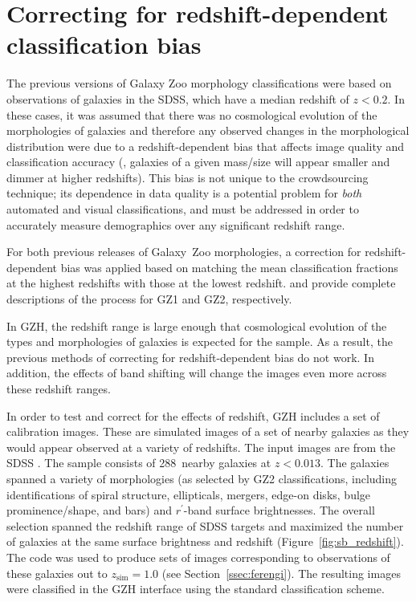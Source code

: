 \documentclass[twocolumn]{aastex6}
\begin{document}
\section{Correcting for redshift-dependent classification bias}\label{sec:debiasing}

The previous versions of Galaxy Zoo morphology classifications
\citep{lin11,wil13} were based on observations of galaxies in the SDSS,
which have a median redshift of $z<0.2$. In these cases, it
was assumed that there was no cosmological evolution of the morphologies of
galaxies and therefore any observed changes in the morphological distribution
were due to a redshift-dependent bias that affects image quality and
classification accuracy (\ie, galaxies of a given mass/size will appear smaller
and dimmer at higher redshifts).  This bias is not unique to the crowdsourcing
technique; its dependence in data quality is a potential problem for
\emph{both} automated and visual classifications, and must be addressed in
order to accurately measure demographics over any significant redshift range. 

For both previous releases of Galaxy~Zoo morphologies, a correction for
redshift-dependent bias was applied based on matching the mean classification
fractions at the highest redshifts with those at the lowest redshift.
\citet{bam09} and \citet{wil13} provide complete descriptions of the process
for GZ1 and GZ2, respectively.

In GZH, the redshift range is large enough that cosmological
evolution of the types and morphologies of galaxies is expected for the \hst{}
sample. As a result, the previous methods of correcting for
redshift-dependent bias do not work. In addition, the effects of band shifting
will change the images even more across these redshift ranges. 

In order to test and correct for the effects of redshift, GZH includes a set of
calibration images.  These are simulated images of a set of nearby galaxies as
they would appear observed at a variety of redshifts.  The input images are
from the SDSS \citep{yor00,str02}.  The sample consists of 288~nearby galaxies
at $z<0.013$. The galaxies spanned a variety of morphologies (as selected by
GZ2 classifications, including identifications of spiral structure,
ellipticals, mergers, edge-on disks, bulge prominence/shape, and bars) and
$r^\prime$-band surface brightnesses.  The overall selection spanned the
redshift range of SDSS targets and maximized the number of \hst{} galaxies at
the same surface brightness and redshift (Figure~\ref{fig:sb_redshift}).  The
\ferengi{} code was used to produce sets of images corresponding to
observations of these galaxies out to $z_\mathrm{sim}=1.0$ (see
Section~\ref{ssec:ferengi}).  The resulting images were classified in the GZH
interface using the standard classification scheme.
\end{document}
